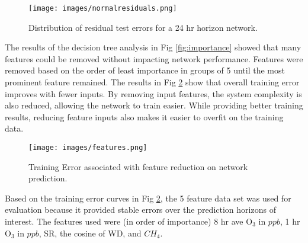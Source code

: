 %
\begin{figure}[H]
\centering
\texttt{[image: images/normalresiduals.png]}
\caption{Distribution of residual test errors for a 24 hr horizon network.}
\label{fig:normalresiduals}
\end{figure}
%

The results of the decision tree analysis in Fig \ref{fig:importance} showed that many features could be removed without impacting network performance. Features were removed based on the order of least importance in groups of 5 until the most prominent feature remained. The results in Fig \ref{fig:features} show that overall training error improves with fewer inputs. By removing input features, the system complexity is also reduced, allowing the network to train easier. While providing better training results, reducing feature inputs also makes it easier to overfit on the training data.
%
\begin{figure}[H]
\centering
\texttt{[image: images/features.png]}
\caption{Training Error associated with feature reduction on network prediction.}
\label{fig:features}
\end{figure}
%
Based on the training error curves in Fig \ref{fig:features}, the 5 feature data set was used for evaluation because it provided stable errors over the prediction horizons of interest. The features used were (in order of importance) 8 hr ave O$_{3}$ in $ppb$, 1 hr O$_{3}$ in $ppb$, SR, the cosine of WD, and $CH_{4}$.

